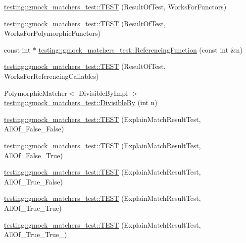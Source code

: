 \begin{DoxyCompactItemize}
\item 
\mbox{\hyperlink{namespacetesting_1_1gmock__matchers__test_a19b7a39915f7ad5a0b741caf7ae4e619}{testing\+::gmock\+\_\+matchers\+\_\+test\+::\+T\+E\+ST}} (Result\+Of\+Test, Works\+For\+Functors)
\item 
\mbox{\hyperlink{namespacetesting_1_1gmock__matchers__test_a976290e53e319b06c51a94f7e450d765}{testing\+::gmock\+\_\+matchers\+\_\+test\+::\+T\+E\+ST}} (Result\+Of\+Test, Works\+For\+Polymorphic\+Functors)
\item 
const int $\ast$ \mbox{\hyperlink{namespacetesting_1_1gmock__matchers__test_af3164fc302e0b727c1eb745bdeb959f6}{testing\+::gmock\+\_\+matchers\+\_\+test\+::\+Referencing\+Function}} (const int \&n)
\item 
\mbox{\hyperlink{namespacetesting_1_1gmock__matchers__test_a00ee08657c9e9e0c306be7b84cd2848c}{testing\+::gmock\+\_\+matchers\+\_\+test\+::\+T\+E\+ST}} (Result\+Of\+Test, Works\+For\+Referencing\+Callables)
\item 
Polymorphic\+Matcher$<$ Divisible\+By\+Impl $>$ \mbox{\hyperlink{namespacetesting_1_1gmock__matchers__test_ac5b1fd3b6a8141c7e83ef6040ed4630f}{testing\+::gmock\+\_\+matchers\+\_\+test\+::\+Divisible\+By}} (int n)
\item 
\mbox{\hyperlink{namespacetesting_1_1gmock__matchers__test_aa9a60a406d9f495de8c8552abf577dd1}{testing\+::gmock\+\_\+matchers\+\_\+test\+::\+T\+E\+ST}} (Explain\+Match\+Result\+Test, All\+Of\+\_\+\+False\+\_\+\+False)
\item 
\mbox{\hyperlink{namespacetesting_1_1gmock__matchers__test_a099aebb5417d5bd85e11aefe935ec345}{testing\+::gmock\+\_\+matchers\+\_\+test\+::\+T\+E\+ST}} (Explain\+Match\+Result\+Test, All\+Of\+\_\+\+False\+\_\+\+True)
\item 
\mbox{\hyperlink{namespacetesting_1_1gmock__matchers__test_a5d386691eaed59994a1d2b65f94b23a9}{testing\+::gmock\+\_\+matchers\+\_\+test\+::\+T\+E\+ST}} (Explain\+Match\+Result\+Test, All\+Of\+\_\+\+True\+\_\+\+False)
\item 
\mbox{\hyperlink{namespacetesting_1_1gmock__matchers__test_a16545b298640b253502d604f52ea95e2}{testing\+::gmock\+\_\+matchers\+\_\+test\+::\+T\+E\+ST}} (Explain\+Match\+Result\+Test, All\+Of\+\_\+\+True\+\_\+\+True)
\item 
\mbox{\hyperlink{namespacetesting_1_1gmock__matchers__test_af1ba4010a24716a51a302f9a518023b5}{testing\+::gmock\+\_\+matchers\+\_\+test\+::\+T\+E\+ST}} (Explain\+Match\+Result\+Test, All\+Of\+\_\+\+True\+\_\+\+True\+\_)
\item 

\end{DoxyCompactItemize}
